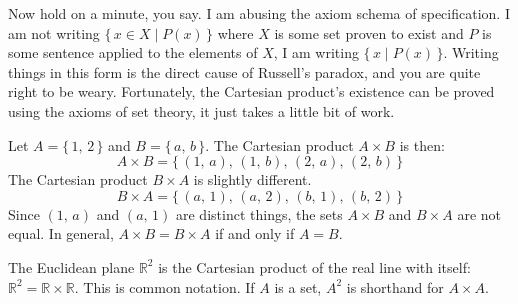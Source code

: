         Now hold on a minute, you say. I am abusing the axiom schema of
        specification. I am not writing $\{\,x\in{X}\;|\;P(x)\,\}$ where $X$
        is some set proven to exist and $P$ is some sentence applied to the
        elements of $X$, I am writing $\{\,x\;|\;P(x)\,\}$. Writing things in
        this form is the direct cause of Russell's paradox, and you are quite
        right to be weary. Fortunately, the Cartesian product's existence can
        be proved using the axioms of set theory, it just takes a little bit
        of work.
        \begin{example}
            Let $A=\{\,1,\,2\,\}$ and $B=\{\,a,\,b\,\}$. The Cartesian product
            $A\times{B}$ is then:
            \begin{equation}
                A\times{B}=\{\,(1,\,a),\,(1,\,b),\,(2,\,a),\,(2,\,b)\,\}
            \end{equation}
            The Cartesian product $B\times{A}$ is slightly different.
            \begin{equation}
                B\times{A}=\{\,(a,\,1),\,(a,\,2),\,(b,\,1),\,(b,\,2)\,\}
            \end{equation}
            Since $(1,\,a)$ and $(a,\,1)$ are distinct things, the sets
            $A\times{B}$ and $B\times{A}$ are not equal. In general,
            $A\times{B}=B\times{A}$ if and only if $A=B$.
        \end{example}
        \begin{example}
            The Euclidean plane $\mathbb{R}^{2}$ is the Cartesian product of
            the real line with itself:
            $\mathbb{R}^{2}=\mathbb{R}\times\mathbb{R}$. This is common
            notation. If $A$ is a set, $A^{2}$ is shorthand for $A\times{A}$.
        \end{example}

